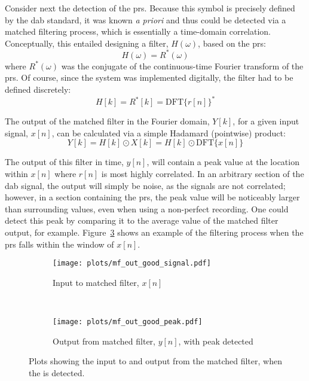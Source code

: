 \documentclass[class=report,11pt,crop=false]{standalone}
\begin{document}
Consider next the detection of the \gls{prs}. Because this symbol is precisely defined by the \gls{dab} standard, it was known \emph{a priori} and thus could be detected via a matched filtering process, which is essentially a time-domain correlation. Conceptually, this entailed designing a filter, \(H(\omega)\), based on the \gls{prs}:
\begin{equation}
  H(\omega) = R^*(\omega)
\end{equation}
where \(R^*(\omega)\) was the conjugate of the continuous-time Fourier transform of the \gls{prs}. Of course, since the system was implemented digitally, the filter had to be defined discretely:
\begin{equation}
  H[k] = R^*[k] = \mathrm{DFT} \{ r[n] \}^*
\end{equation}


The output of the matched filter in the Fourier domain, \(Y[k]\), for a given input signal, \(x[n]\), can be calculated via a simple Hadamard (pointwise) product:
\begin{equation}
  Y[k] = H[k] \odot X[k] = H[k] \odot \mathrm{DFT} \{ x[n] \}
\end{equation}

The output of this filter in time, \(y[n]\), will contain a peak value at the location within \(x[n]\) where \(r[n]\) is most highly correlated. In an arbitrary section of the \gls{dab} signal, the output will simply be noise, as the signals are not correlated; however, in a section containing the \gls{prs}, the peak value will be noticeably larger than surrounding values, even when using a non-perfect recording. One could detect this peak by comparing it to the average value of the matched filter output, for example. Figure~\ref{fig:mf_out_good} shows an example of the filtering process when the \gls{prs} falls within the window of \(x[n]\).

\begin{figure}[htbp]
  \centering
  \captionsetup{type=figure}
  \begin{subfigure}[t]{\textwidth}
    \centering
    \captionsetup{type=figure}
    \texttt{[image: plots/mf\_out\_good\_signal.pdf]}
    \caption{Input to matched filter, \(x[n]\)}
    \label{fig:mf_out_good_signal}
  \end{subfigure}%
  \\
  \begin{subfigure}[t]{\textwidth}
    \centering
    \captionsetup{type=figure}
    \texttt{[image: plots/mf\_out\_good\_peak.pdf]}
    \caption{Output from matched filter, \(y[n]\), with peak detected}
    \label{fig:mf_out_good_peak}
  \end{subfigure}
  \caption{Plots showing the input to and output from the matched filter, when the  is detected.}
  \label{fig:mf_out_good}
\end{figure}
\end{document}
